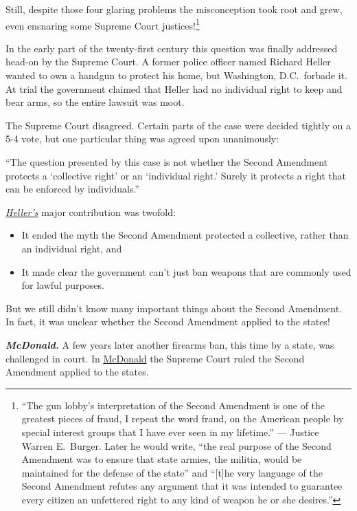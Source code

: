 \documentclass[10pt]{article}
\begin{document}
Still, despite those four glaring problems the misconception took root and grew, even ensnaring some Supreme Court justices!\footnote{``The gun lobby's interpretation of the Second Amendment is one of the greatest pieces of fraud, I repeat the word fraud, on the American people by special interest groups that I have ever seen in my lifetime.'' --- Justice Warren E.~Burger.  Later he would write, ``the real purpose of the Second Amendment was to ensure that state armies, the militia, would be maintained for the defense of the state'' and ``[t]he very language of the Second Amendment refutes any argument that it was intended to guarantee every citizen an unfettered right to any kind of weapon he or she desires.''}

In the early part of the twenty-first century this question was finally addressed head-on by the Supreme Court.  A former police officer named Richard Heller wanted to own a handgun to protect his home, but Washington, D.C.~forbade it.  At trial the government claimed that Heller had no individual right to keep and bear arms, so the entire lawsuit was moot.

The Supreme Court disagreed.  Certain parts of the case were decided tightly on a 5-4 vote, but one particular thing was agreed upon unanimously:

\vspace{0.5cm}

``The question presented by this case is not whether the Second Amendment protects a `collective right' or an `individual right.' Surely it protects a right that can be enforced by individuals.''

\vspace{0.5cm}

\href{https://scholar.google.com/scholar_case?case=6484080926445491577}{\textit{Heller's}} major contribution was twofold:

\begin{itemize}
  \item It ended the myth the Second Amendment protected a collective, rather than an individual right, and
  \item It made clear the government can't just ban weapons that are commonly used for lawful purposes.
\end{itemize}

But we still didn't know many important things about the Second Amendment.  In fact, it was unclear whether the Second Amendment applied to the states!

\vspace{0.5cm}
\textbf{\textit{McDonald.}}  A few years later another firearms ban, this time by a state, was challenged in court.  In \href{https://supreme.justia.com/cases/federal/us/561/742/}{McDonald} the Supreme Court ruled the Second Amendment applied to the states.
\end{document}
